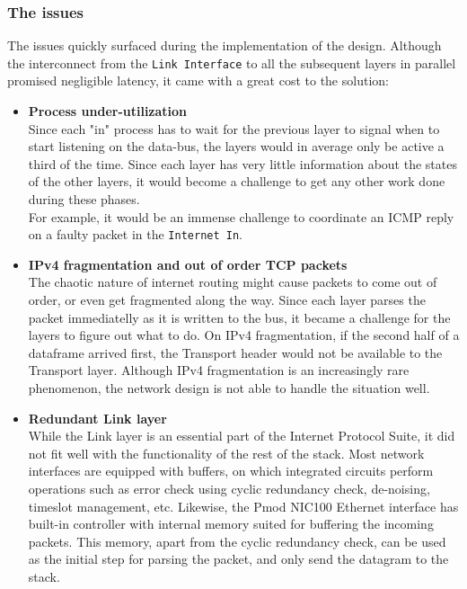 \subsubsection{The issues}
The issues quickly surfaced during the implementation of the design. Although 
the interconnect from the \texttt{Link Interface} to all the subsequent layers
in parallel promised negligible latency, it came with a great cost to the solution:
\begin{itemize}
\item \textbf{Process under-utilization}\\
Since each "in" process has to wait for the previous layer to signal when to 
start listening on the data-bus, the layers would in average only be active a third
of the time. Since each layer has very little information about the states of 
the other layers, it would become a challenge to get any other work done during
these phases.\\
For example, it would be an immense challenge to coordinate an ICMP reply on a 
faulty packet in the \texttt{Internet In}.

\item \textbf{IPv4 fragmentation and out of order TCP packets}\\
The chaotic nature of internet routing might cause packets to come out of order,
or even get fragmented along the way. Since each layer parses the packet immediatelly
as it is written to the bus, it became a challenge for the layers to figure out 
what to do. On IPv4 fragmentation, if the second half of a dataframe arrived 
first, the Transport header would not be available to the Transport layer. 
Although IPv4 fragmentation is an increasingly rare phenomenon, the network 
design is not able to handle the situation well.  


\item \textbf{Redundant Link layer}\\
While the Link layer is an essential part of the Internet Protocol Suite, it did 
not fit well with the functionality of the rest of the stack. 
Most network interfaces are equipped with buffers, on which integrated circuits
perform operations such as error check using cyclic redundancy check, de-noising,
timeslot management, etc. 
Likewise, the Pmod NIC100 Ethernet interface has built-in controller with 
internal memory suited for buffering the incoming packets\cite{microchip_enc424j600}.
This memory, apart from the cyclic redundancy check, can be used as the initial
step for parsing the packet, and only send the datagram to the stack.

\end{itemize}

